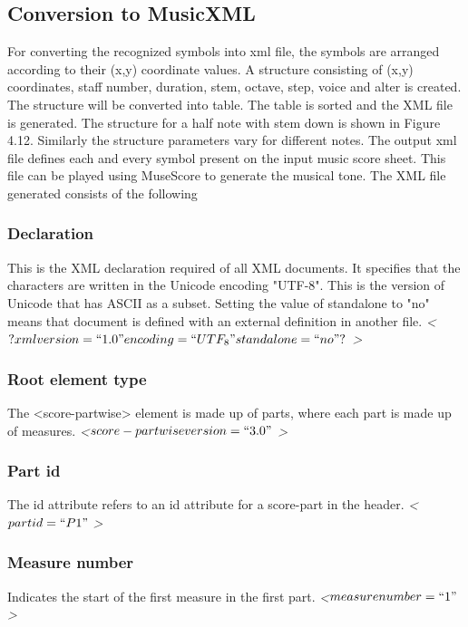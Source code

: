 \documentclass[journal]{IEEEtran}
\begin{document}
\subsection{Conversion to MusicXML}
For converting the recognized symbols into xml file, the symbols are arranged according to their (x,y) coordinate values. A structure consisting of (x,y) coordinates, staff number, duration, stem, octave, step, voice and alter is created. The structure will be converted into table. The table is sorted and the XML file is generated. The structure for a half note with stem down is shown in Figure 4.12. Similarly the structure parameters vary for different notes. The output xml file defines each and every symbol present on the input music score sheet. This file can be played using MuseScore to generate the musical tone. 
The XML file generated consists of the following
\subsubsection{Declaration}

This is the XML declaration required of all XML documents. It specifies that the characters are
written in the Unicode encoding "UTF-8". This is the version of Unicode that has ASCII as a subset.
Setting the value of standalone to "no" means that document is defined with an external definition
in another file.\newline
\textit{ \textless $? xml version=``1.0" encoding=``UTF_8" standalone=``no"? $ \textgreater }

\subsubsection{Root element type}
The <score-partwise> element is made up of parts, where each
part is made up of measures.\newline
\textit{ \textless $ score-partwise version = ``3.0" $ \textgreater }  

\subsubsection{ Part id}
The id attribute refers to an id attribute for a score-part in the header. \newline
\textit{ \textless $part id=``P1" $ \textgreater } 

\subsubsection{ Measure number}
Indicates the start of the first measure in the first part.\newline
\textit{ \textless $measure number=``1" $ \textgreater } 
\end{document}
